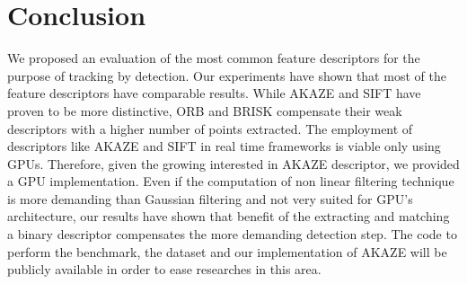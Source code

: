 \section{Conclusion}

We proposed an evaluation of the most common feature descriptors for the purpose of tracking by detection. Our experiments have shown that most of the feature descriptors have comparable results. While AKAZE and SIFT have proven to be more distinctive, ORB and BRISK compensate their weak descriptors with a higher number of points extracted. The employment of descriptors like AKAZE and SIFT in real time frameworks is viable only using GPUs. Therefore, given the growing interested in AKAZE descriptor, we provided a GPU implementation. Even if the computation of non linear filtering technique is more demanding than Gaussian filtering and not very suited for GPU's architecture, our results have shown that benefit of the extracting and matching a binary descriptor compensates the more demanding detection step. The code to perform the benchmark, the dataset and our implementation of AKAZE will be publicly available in order to ease researches in this area.


